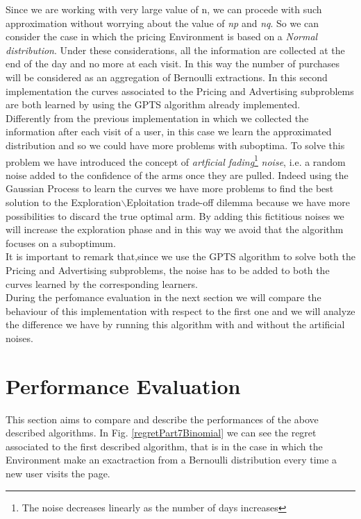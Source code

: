 Since we are working with very large value of n, we can procede with such approximation without worrying about the value of \textit{np} and \textit{nq}.
So we can consider the case in which the pricing Environment is based on a \textit{Normal distribution}. Under these considerations, all the information are collected at the end of the day and no more at each visit. In this way the number of purchases will be considered as an aggregation of Bernoulli extractions.
In this second implementation the curves associated to the Pricing and Advertising subproblems are both learned by using the GPTS algorithm already implemented.\\
Differently from the previous implementation in which we collected the information after each visit of a user, in this case we learn the approximated distribution and so we could have more problems with suboptima. To solve this problem we have introduced the concept of \textit{artficial fading}\footnote{The noise decreases linearly as the number of days increases} \textit{noise}, i.e. a random noise added to the confidence of the arms once they are pulled. Indeed using the Gaussian Process to learn the curves we have more problems to find the best solution to the Exploration$\backslash$Eploitation trade-off dilemma because we have more possibilities to discard the true optimal arm. By adding this fictitious noises we will increase the exploration phase and in this way we avoid that the algorithm focuses on a suboptimum.\\ It is important to remark that,since we use the GPTS algorithm to solve both the Pricing and Advertising subproblems, the noise has to be added to both the curves learned by the corresponding learners.\\ During the perfomance evaluation in the next section we will compare the behaviour of this implementation with respect to the first one and we will analyze the difference we have by running this algorithm with and without the artificial noises.

\section{Performance Evaluation}
This section aims to compare and describe the performances of the above described algorithms. In Fig. \ref{regretPart7Binomial} we can see the regret associated to the first described algorithm, that is in the case in which the Environment make an exactraction from a Bernoulli distribution every time a new user visits the page. 

